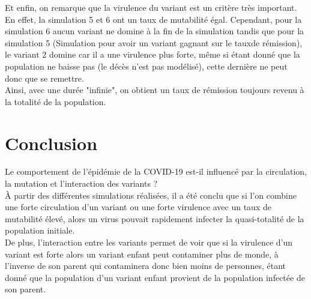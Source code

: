 \documentclass{article}
\begin{document}
Et enfin, on remarque que la virulence du variant est un critère très important. En effet, la simulation 5 et 6 ont un taux de mutabilité égal. Cependant, pour la simulation 6 aucun variant ne domine à la fin de la simulation tandis que pour la simulation 5 (Simulation pour avoir un variant gagnant sur le tauxde rémission), le variant 2 domine car il a une virulence plus forte, même si étant donné que la population ne baisse pas (le décès n'est pas modélisé), cette dernière ne peut donc que se remettre.\\

Ainsi, avec une durée "infinie", on obtient un taux de rémission toujours revenu à la totalité de la population. \\

\section{Conclusion}

Le comportement de l'épidémie de la COVID-19 est-il influencé par la circulation, la mutation et l'interaction des variants ?\\

À partir des différentes simulations réalisées, il a été conclu que si l'on combine une forte circulation d'un variant ou une forte virulence avec un taux de mutabilité élevé, alors un virus pouvait rapidement infecter la quasi-totalité de la population initiale.\\

De plus, l'interaction entre les variants permet de voir que si la virulence d'un variant est forte alors un variant enfant peut contaminer plus de monde, à l'inverse de son parent qui contaminera donc bien moins de personnes, étant donné que la population d'un variant enfant provient de la population infectée de son parent. \\
\end{document}
